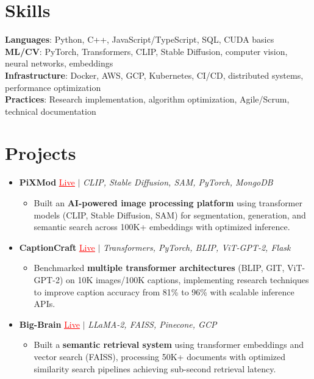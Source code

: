 \documentclass[letterpaper,10pt]{article}
\newcommand{\resumeItem}[1]{\item\small{{#1 \vspace{-2pt}}}}
\newcommand{\resumeProjectHeading}[1]{\item \small #1 \vspace{-2pt}}
\newcommand{\resumeSubHeadingListStart}{\begin{itemize}[leftmargin=0.0in, label={}]}
\newcommand{\resumeSubHeadingListEnd}{\end{itemize}}
\newcommand{\resumeProjItemListStart}{\begin{itemize}[leftmargin=0.15in,label=\textbullet,itemsep=0pt,topsep=0pt,parsep=0pt,partopsep=0pt]}
\newcommand{\resumeProjItemListEnd}{\end{itemize}\vspace{-4pt}}
\begin{document}
\section{Skills}
\begin{itemize}[leftmargin=0.15in, label={}]
\small{\item{
\textbf{Languages}: Python, C++, JavaScript/TypeScript, SQL, CUDA basics \\
\textbf{ML/CV}: PyTorch, Transformers, CLIP, Stable Diffusion, computer vision, neural networks, embeddings \\
\textbf{Infrastructure}: Docker, AWS, GCP, Kubernetes, CI/CD, distributed systems, performance optimization \\
\textbf{Practices}: Research implementation, algorithm optimization, Agile/Scrum, technical documentation
}}
\end{itemize}
\vspace{-16pt}
\section{Projects}
\resumeSubHeadingListStart
\vspace{-2pt}
\resumeProjectHeading{\textbf{PiXMod} {\href{https://pixmod.vercel.app/}{\textcolor{red}{\underline{Live}}}} $|$ \emph{CLIP, Stable Diffusion, SAM, PyTorch, MongoDB}}
\resumeProjItemListStart
\resumeItem{Built an \textbf{AI-powered image processing platform} using transformer models (CLIP, Stable Diffusion, SAM) for segmentation, generation, and semantic search across 100K+ embeddings with optimized inference.}
\resumeProjItemListEnd
\vspace{3pt}
\resumeProjectHeading{\textbf{CaptionCraft} {\href{https://imagecaptiongenerator.com/}{\textcolor{red}{\underline{Live}}}} $|$ \emph{Transformers, PyTorch, BLIP, ViT-GPT-2, Flask}}
\resumeProjItemListStart
\resumeItem{Benchmarked \textbf{multiple transformer architectures} (BLIP, GIT, ViT-GPT-2) on 10K images/100K captions, implementing research techniques to improve caption accuracy from 81\% to 96\% with scalable inference APIs.}
\resumeProjItemListEnd
\vspace{3pt}
\resumeProjectHeading{\textbf{Big-Brain} {\href{https://big-brain-pied.vercel.app/}{\textcolor{red}{\underline{Live}}}} $|$ \emph{LLaMA-2, FAISS, Pinecone, GCP}}
\resumeProjItemListStart
\resumeItem{Built a \textbf{semantic retrieval system} using transformer embeddings and vector search (FAISS), processing 50K+ documents with optimized similarity search pipelines achieving sub-second retrieval latency.}
\resumeProjItemListEnd
\resumeSubHeadingListEnd
\end{document}
